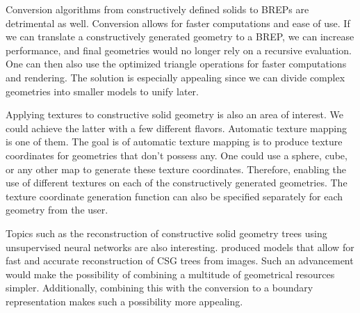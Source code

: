 \documentclass[a4paper,11pt,oneside]{article}
\begin{document}
Conversion algorithms from constructively defined solids to BREPs are detrimental as well. Conversion allows for faster computations and ease of use. If we can translate a constructively generated geometry to a BREP,  we can increase performance, and final geometries would no longer rely on a recursive evaluation. One can then also use the optimized triangle operations for faster computations and rendering. The solution is especially appealing since we can divide complex geometries into smaller models to unify later.

Applying textures to constructive solid geometry is also an area of interest. We could achieve the latter with a few different flavors. Automatic texture mapping is one of them. The goal is of automatic texture mapping is to produce texture coordinates for geometries that don't possess any. One could use a sphere, cube, or any other map to generate these texture coordinates. Therefore, enabling the use of different textures on each of the constructively generated geometries.	 The texture coordinate generation function can also be specified separately for each geometry from the user.

Topics such as the reconstruction of constructive solid geometry trees using unsupervised neural networks are also interesting. \cite{ucsgnet_ml} produced models that allow for fast and accurate reconstruction of CSG trees from images. Such an advancement would make the possibility of combining a multitude of geometrical resources simpler. Additionally, combining this with the conversion to a boundary representation makes such a possibility more appealing.
  

\newpage
%
%
\printbibliography
\end{document}

